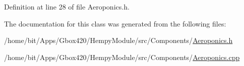 Definition at line 28 of file Aeroponics.\+h.



The documentation for this class was generated from the following files\+:\begin{DoxyCompactItemize}
\item 
/home/bit/\+Apps/\+Gbox420/\+Hempy\+Module/src/\+Components/\hyperlink{_hempy_module_2src_2_components_2_aeroponics_8h}{Aeroponics.\+h}\item 
/home/bit/\+Apps/\+Gbox420/\+Hempy\+Module/src/\+Components/\hyperlink{_hempy_module_2src_2_components_2_aeroponics_8cpp}{Aeroponics.\+cpp}\end{DoxyCompactItemize}
